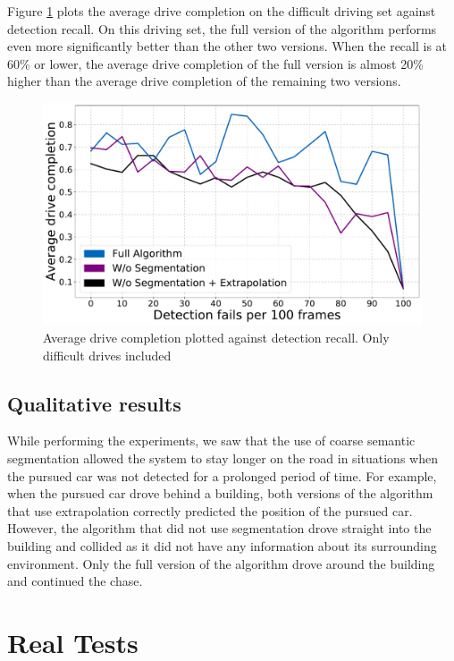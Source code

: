 \documentclass{ctuthesis/ctuthesis}
\begin{document}
Figure \ref{f:detection_recall_difficult} plots the average drive completion on the difficult driving set against detection recall. On this driving set, the full version of the algorithm performs even more significantly better than the other two versions. When the recall is at 60\% or lower, the average drive completion of the full version is almost 20\% higher than the average drive completion of the remaining two versions.

\begin{figure}[]
    \centering
    \includegraphics[width=1\textwidth]{images/recall_chart7_difficult.pdf}
    
    \caption{Average drive completion plotted against detection recall. Only difficult drives included}\label{f:detection_recall_difficult}
\end{figure}


\subsection{Qualitative results}
While performing the experiments, we saw that the use of coarse semantic segmentation allowed the system to stay longer on the road in situations when the pursued car was not detected for a prolonged period of time. For example, when the pursued car drove behind a building, both versions of the algorithm that use extrapolation correctly predicted the position of the pursued car. However, the algorithm that did not use segmentation drove straight into the building and collided as it did not have any information about its surrounding environment. Only the full version of the algorithm drove around the building and continued the chase.



\section{Real Tests}
\end{document}
